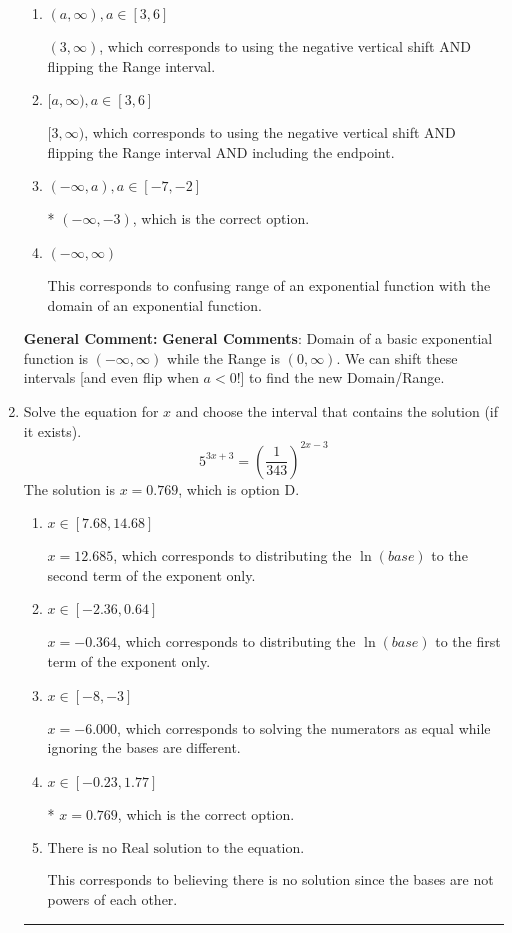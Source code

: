 \documentclass{extbook}[14pt]
\newcommand{\litem}[1]{\item #1

\rule{\textwidth}{0.4pt}}
\begin{document}
\begin{enumerate}
{\begin{enumerate}[label=\Alph*.]
$(-\infty, -3]$, which corresponds to including the endpoint.
\item \( (a, \infty), a \in [3, 6] \)

$(3, \infty)$, which corresponds to using the negative vertical shift AND flipping the Range interval.
\item \( [a, \infty), a \in [3, 6] \)

$[3, \infty)$, which corresponds to using the negative vertical shift AND flipping the Range interval AND including the endpoint.
\item \( (-\infty, a), a \in [-7, -2] \)

* $(-\infty, -3)$, which is the correct option.
\item \( (-\infty, \infty) \)

This corresponds to confusing range of an exponential function with the domain of an exponential function.
\end{enumerate}

\textbf{General Comment:} \textbf{General Comments}: Domain of a basic exponential function is $(-\infty, \infty)$ while the Range is $(0, \infty)$. We can shift these intervals [and even flip when $a<0$!] to find the new Domain/Range.
}
\litem{
Solve the equation for $x$ and choose the interval that contains the solution (if it exists).
\[ 5^{3x+3} = \left(\frac{1}{343}\right)^{2x-3} \]The solution is \( x = 0.769 \), which is option D.\begin{enumerate}[label=\Alph*.]
\item \( x \in [7.68, 14.68] \)

$x = 12.685$, which corresponds to distributing the $\ln(base)$ to the second term of the exponent only.
\item \( x \in [-2.36, 0.64] \)

$x = -0.364$, which corresponds to distributing the $\ln(base)$ to the first term of the exponent only.
\item \( x \in [-8, -3] \)

$x = -6.000$, which corresponds to solving the numerators as equal while ignoring the bases are different.
\item \( x \in [-0.23, 1.77] \)

* $x = 0.769$, which is the correct option.
\item \( \text{There is no Real solution to the equation.} \)

This corresponds to believing there is no solution since the bases are not powers of each other.
\end{enumerate}

}
\end{enumerate}
\end{document}
